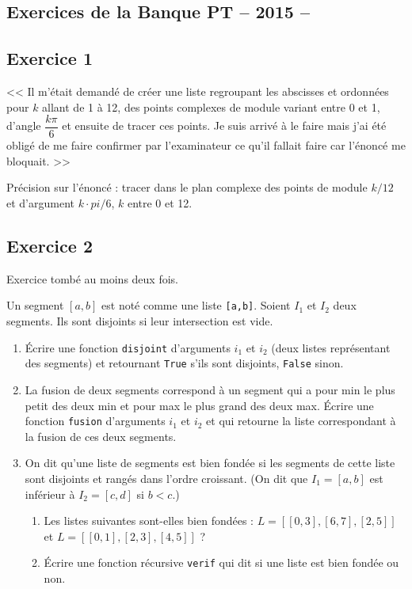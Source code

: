 \documentclass[10pt,fleqn]{article} %
\begin{document}
\newpage 
\begin{multicols}{2}
\section{Exercices de la Banque PT -- 2015 -- }
\subsection*{Exercice 1}
<< Il m'était demandé de créer une liste regroupant les abscisses et ordonnées pour $k$ allant de 1 à 12, des points complexes de module variant entre 0 et 1, d'angle $\dfrac{k\pi}{6}$ et ensuite de tracer ces points. Je suis arrivé à le faire mais j'ai été obligé de me faire confirmer par l'examinateur ce qu'il fallait faire car l'énoncé me bloquait.
>>

Précision sur l'énoncé : tracer dans le plan complexe des points de module
$k/12$ et d'argument $k\cdot pi/6$, $k$ entre 0 et 12.

\subsection*{Exercice 2}
\begin{rem}
Exercice tombé au moins deux fois.
\end{rem}

Un segment $[a,b]$ est noté comme une liste \texttt{[a,b]}. Soient $I_1$ et $I_2$ deux segments. Ils sont disjoints si leur intersection est vide. 

\begin{enumerate}
\item Écrire une fonction \texttt{disjoint} d'arguments $i_1$ et $i_2$ (deux listes représentant des segments) et retournant \texttt{True} s'ils sont disjoints, \texttt{False} sinon. 
\item La fusion de deux segments correspond à un segment qui a pour min le plus petit des deux min et pour max le plus grand des deux max. Écrire une fonction \texttt{fusion} d'arguments $i_1$ et $i_2$ et qui retourne la liste correspondant à la fusion de ces deux segments. 
\item On dit qu'une liste de segments est bien fondée si les segments de cette liste sont disjoints et rangés dans l'ordre croissant. (On dit que $I_1=[a,b]$ est inférieur à $I_2=[c,d]$ si $b<c$.)
\begin{enumerate}
\item Les listes suivantes sont-elles bien fondées : $L=[[0,3],[6,7],[2,5]]$ et $L=[[0,1],[2,3],[4,5]]$ ?
\item Écrire une fonction récursive \texttt{verif} qui dit si une liste est bien fondée ou non.
\end{enumerate}
\end{enumerate}




\end{multicols}
\end{document}
